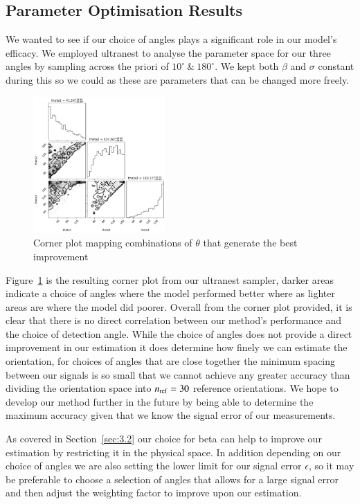\documentclass[final, 3p]{elsarticle}
\begin{document}
\subsection{Parameter Optimisation Results}
\label{sec:3.3}

We wanted to see if our choice of angles plays a significant role in
our model's efficacy. We employed ultranest to analyse the parameter
space for our three angles by sampling across the priori of
$10^{\circ} \ \& \ 180^{\circ}$.   We kept both $\beta$ and $\sigma$
constant during this so we could as these are parameters that can be
changed more freely.

\begin{figure}[h]
	\label{fig:corner}
	\centering
	\includegraphics[width=0.45\textwidth]{./Images/corneranglesfreed-1.png}
	\caption{Corner plot mapping combinations of $\theta$ that generate the best improvement}
\end{figure}

Figure~\ref{fig:corner} is the resulting corner plot from our
ultranest sampler, darker areas indicate a choice of angles where the
model performed better where as lighter areas are where the model did
poorer.  Overall from the corner plot provided, it is clear that there
is no direct correlation between our method's performance and the
choice of detection angle. While the choice of angles does not provide
a direct improvement in our estimation it does determine how finely we
can estimate the orientation, for choices of angles that are close
together the minimum spacing between our signals is so small that we
cannot achieve any greater accuracy than dividing the orientation
space into $n_{\rm ref}=30$ reference orientations.  We hope to
develop our method further in the future by being able to determine
the maximum accuracy given that we know the signal error of our
measurements.

As covered in Section~\ref{sec:3.2} our choice for beta can help to
improve our estimation by restricting it in the physical space. In
addition depending on our choice of angles we are also setting the
lower limit for our signal error $\epsilon$, so it may be preferable
to choose a selection of angles that allows for a large signal error
and then adjust the weighting factor to improve upon our estimation.
\end{document}
